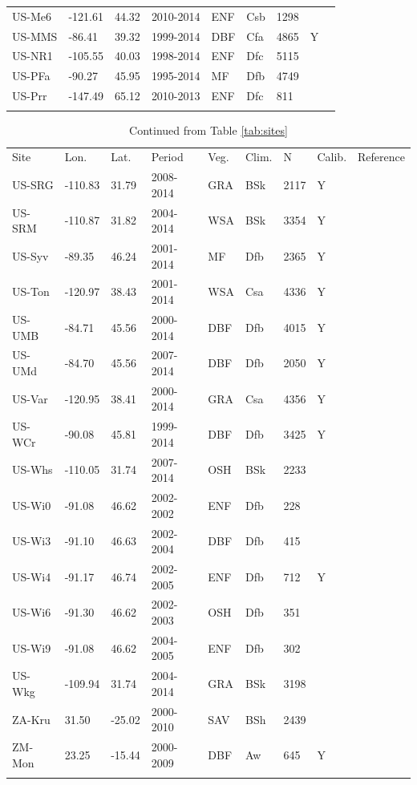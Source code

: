 \documentclass[gmd, manuscript]{copernicus}
\begin{document}
\begin{table}[t]
\begin{tabular}{lllllllll}
  US-Me6 & -121.61 & 44.32 & 2010-2014 & ENF & Csb & 1298 &  & \citet{US-Me6} \\ 
  US-MMS & -86.41 & 39.32 & 1999-2014 & DBF & Cfa & 4865 & Y & \citet{US-MMS} \\ 
  US-NR1 & -105.55 & 40.03 & 1998-2014 & ENF & Dfc & 5115 &  & \citet{US-NR1} \\ 
  US-PFa & -90.27 & 45.95 & 1995-2014 & MF & Dfb & 4749 &  & \citet{US-PFa} \\ 
  US-Prr & -147.49 & 65.12 & 2010-2013 & ENF & Dfc & 811 &  & \citet{US-Prr} \\ 
    \bottomhline
\end{tabular}
\label{tab:sites3}
\end{table}
\clearpage

\begin{table}[t]
\caption{Continued from Table \ref{tab:sites}} 
\begin{tabular}{lllllllll}
  \tophline
  Site & Lon. & Lat. & Period & Veg. & Clim. & N & Calib. & Reference \\ 
  \middlehline  
  US-SRG & -110.83 & 31.79 & 2008-2014 & GRA & BSk & 2117 & Y & \citet{US-SRG} \\ 
  US-SRM & -110.87 & 31.82 & 2004-2014 & WSA & BSk & 3354 & Y & \citet{US-SRM} \\ 
  US-Syv & -89.35 & 46.24 & 2001-2014 & MF & Dfb & 2365 & Y & \citet{US-Syv} \\ 
  US-Ton & -120.97 & 38.43 & 2001-2014 & WSA & Csa & 4336 & Y & \citet{US-Ton} \\ 
  US-UMB & -84.71 & 45.56 & 2000-2014 & DBF & Dfb & 4015 & Y & \citet{US-UM} \\ 
  US-UMd & -84.70 & 45.56 & 2007-2014 & DBF & Dfb & 2050 & Y & \citet{US-UM} \\ 
  US-Var & -120.95 & 38.41 & 2000-2014 & GRA & Csa & 4356 & Y & \citet{US-Var} \\ 
  US-WCr & -90.08 & 45.81 & 1999-2014 & DBF & Dfb & 3425 & Y & \citet{US-WCr} \\ 
  US-Whs & -110.05 & 31.74 & 2007-2014 & OSH & BSk & 2233 &  & \citet{US-Whs} \\ 
  US-Wi0 & -91.08 & 46.62 & 2002-2002 & ENF & Dfb & 228 &  & \citet{US-Wi} \\ 
  US-Wi3 & -91.10 & 46.63 & 2002-2004 & DBF & Dfb & 415 &  & \citet{US-Wi} \\ 
  US-Wi4 & -91.17 & 46.74 & 2002-2005 & ENF & Dfb & 712 & Y & \citet{US-Wi} \\ 
  US-Wi6 & -91.30 & 46.62 & 2002-2003 & OSH & Dfb & 351 &  & \citet{US-Wi} \\ 
  US-Wi9 & -91.08 & 46.62 & 2004-2005 & ENF & Dfb & 302 &  & \citet{US-Wi} \\ 
  US-Wkg & -109.94 & 31.74 & 2004-2014 & GRA & BSk & 3198 &  & \citet{US-Wkg} \\ 
  ZA-Kru & 31.50 & -25.02 & 2000-2010 & SAV & BSh & 2439 &  & \citet{ZA-Kru} \\ 
  ZM-Mon & 23.25 & -15.44 & 2000-2009 & DBF & Aw & 645 & Y & \citet{ZM-Mon} \\ 
  \bottomhline
\end{tabular}
\label{tab:sites4}
\end{table}
\end{document}
